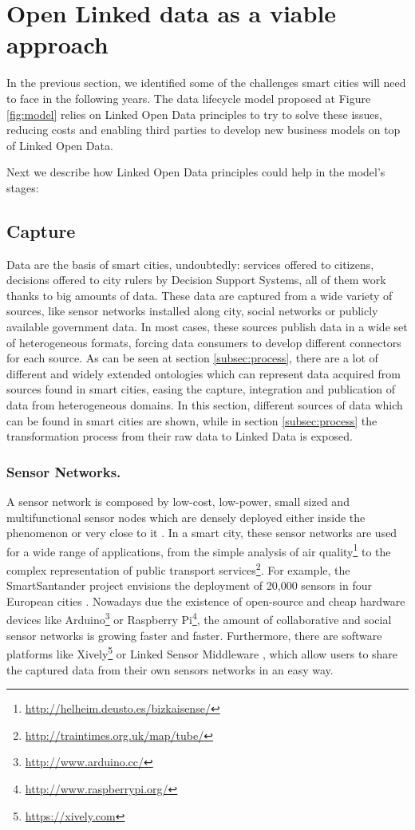 \section{Open Linked data as a viable approach}

In the previous section, we identified some of the challenges smart cities will need to face in the following years. The data lifecycle model proposed at Figure \ref{fig:model} relies on Linked Open Data principles to try to solve these issues, reducing costs and enabling third parties to develop new business models on top of Linked Open Data.

Next we describe how Linked Open Data principles could help in the model's stages:

\subsection{Capture}

Data are the basis of smart cities, undoubtedly: services offered to citizens, decisions offered to city rulers by Decision Support Systems, all of them work thanks to big amounts of data. These data are captured from a wide variety of sources, like sensor networks installed along city, social networks or publicly available government data. In most cases, these sources publish data in a wide set of heterogeneous formats, forcing data consumers to develop different connectors for each source. As can be seen at section \ref{subsec:process}, there are a lot of different and widely extended ontologies which can represent data acquired from sources found in smart cities, easing the capture, integration and publication of data from heterogeneous domains. In this section, different sources of data which can be found in smart cities are shown, while in section \ref{subsec:process} the transformation process from their raw data to Linked Data is exposed. 

\subsubsection{Sensor Networks.}

A sensor network is composed by low-cost, low-power, small sized and multifunctional sensor nodes which are densely deployed either inside the phenomenon or very close to it \cite{akyildiz_survey_2002}. In a smart city, these sensor networks are used for a wide range of applications, from the simple analysis of air quality\footnote{\url{http://helheim.deusto.es/bizkaisense/}} to the complex representation of public transport services\footnote{\url{http://traintimes.org.uk/map/tube/}}. For example, the SmartSantander project envisions the deployment of 20,000 sensors in four European cities \cite{sanchez_smartsantander:_2011}. Nowadays due the existence of open-source and cheap hardware devices like Arduino\footnote{\url{http://www.arduino.cc/}} or Raspberry Pi\footnote{\url{http://www.raspberrypi.org/}}, the amount of collaborative and social sensor networks is growing faster and faster. Furthermore, there are software platforms like Xively\footnote{\url{https://xively.com}} or Linked Sensor Middleware \cite{le-phuoc_linked_2011}, which allow users to share the captured data from their own sensors networks in an easy way.

